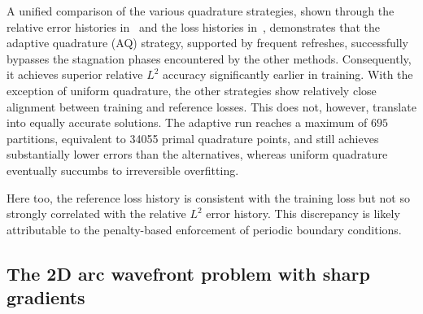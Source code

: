 \documentclass[oneside,reqno,11pt,a4paper]{amsart}
\theoremstyle{definition}
\begin{document}
A unified comparison of the various quadrature strategies, shown through the
relative error histories in~ and
the loss histories in~,
demonstrates that the adaptive quadrature (AQ) strategy, supported by frequent
refreshes, successfully bypasses the stagnation phases encountered by the
other methods. Consequently, it achieves superior relative $L^2$ accuracy
significantly earlier in training.
With the exception of uniform quadrature, the other strategies show relatively
close alignment between training and reference losses. This does not,
however, translate into equally accurate solutions. The adaptive run reaches a
maximum of $695$ partitions, equivalent to \num{34055} primal quadrature
points, and still achieves substantially lower errors than the alternatives,
whereas uniform quadrature eventually succumbs to irreversible overfitting.

Here too, the reference loss history is consistent with the training loss but
not so strongly correlated with the relative $L^2$ error history. This
discrepancy is likely attributable to the penalty-based enforcement of
periodic boundary conditions. 


%
\subsection{The 2D arc wavefront problem with sharp gradients}
\label{sec:poisson-aq}
\end{document}
